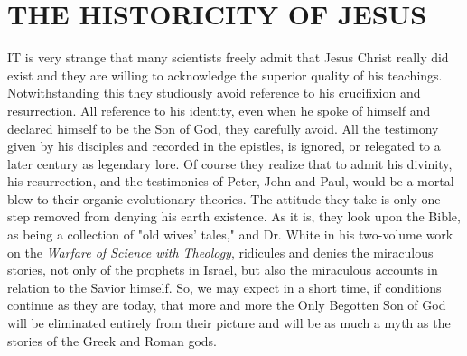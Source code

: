 \chapter{THE HISTORICITY OF JESUS}

IT is very strange that many scientists freely admit that Jesus Christ really did exist and they
are willing to acknowledge the superior quality of his teachings. Notwithstanding this they
studiously avoid reference to his crucifixion and resurrection. All reference to his identity,
even when he spoke of himself and declared himself to be the Son of God, they carefully
avoid. All the testimony given by his disciples and recorded in the epistles, is ignored, or
relegated to a later century as legendary lore. Of course they realize that to admit his divinity,
his resurrection, and the testimonies of Peter, John and Paul, would be a mortal blow to their
organic evolutionary theories. The attitude they take is only one step removed from denying
his earth existence. As it is, they look upon the Bible, as being a collection of "old wives'
tales," and Dr. White in his two-volume work on the \textit{Warfare of Science with Theology},
ridicules and denies the miraculous stories, not only of the prophets in Israel, but also the
miraculous accounts in relation to the Savior himself. So, we may expect in a short time, if
conditions continue as they are today, that more and more the Only Begotten Son of God will
be eliminated entirely from their picture and will be as much a myth as the stories of the
Greek and Roman gods.

